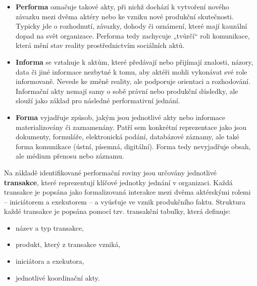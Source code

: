 \begin{itemize}
  \item \textbf{Performa} označuje takové akty, při nichž dochází k vytvoření nového závazku mezi dvěma aktéry nebo ke vzniku nové produkční skutečnosti. Typicky jde o rozhodnutí, závazky, dohody či oznámení, které mají kauzální dopad na svět organizace. Performa tedy zachycuje „tvůrčí“ roli komunikace, která mění stav reality prostřednictvím sociálních aktů.
  
  \item \textbf{Informa} se vztahuje k aktům, které předávají nebo přijímají znalosti, názory, data či jiné informace nezbytné k tomu, aby aktéři mohli vykonávat své role informovaně. Nevede ke změně reality, ale podporuje orientaci a rozhodování. Informační akty nemají samy o sobě právní nebo produkční důsledky, ale slouží jako základ pro následné performativní jednání.
  
  \item \textbf{Forma} vyjadřuje způsob, jakým jsou jednotlivé akty nebo informace materializovány či zaznamenány. Patří sem konkrétní reprezentace jako jsou dokumenty, formuláře, elektronická podání, databázové záznamy, ale také forma komunikace (ústní, písemná, digitální). Forma tedy nevyjadřuje obsah, ale médium přenosu nebo záznamu. \cite{Pergl2023DEMO_modely,Dietz2020}
\end{itemize}

Na základě identifikované performační roviny jsou určovány jednotlivé \textbf{transakce}, které reprezentují klíčové jednotky jednání v organizaci. Každá transakce je popsána jako formalizovaná interakce mezi dvěma aktérskými rolemi – iniciátorem a exekutorem – a vyúsťuje ve vznik produkčního faktu. \cite{Pergl2023DEMO_modely} Struktura každé transakce je popsána pomocí tzv. transakční tabulky, která definuje:

\begin{itemize}
  \item název a typ transakce,
  \item produkt, který z transakce vzniká,
  \item iniciátora a exekutora,
  \item jednotlivé koordinační akty.
\end{itemize}

